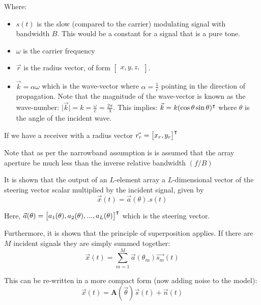 Where:
\begin{itemize}
  \item \(s(t)\) is the slow (compared to the carrier) modulating signal with bandwidth \(B\). This would be a constant for a signal that is a pure tone.
  \item \(\omega\) is the carrier frequency
  \item \( \vec{r} \) is the radius vector, of form \( \begin{bmatrix} x, y, z, \end{bmatrix} \).
  \item \(\vec{k} = \alpha\omega\) which is the wave-vector where \(\alpha = \frac{1}{c}\) pointing in the direction of propagation. Note that the magnitude of the wave-vector is known as the wave-number: \(\lvert \vec{k} \rvert = k = \frac{\omega}{c} = \frac{2\pi}{\lambda}\). This implies: \(\vec{k} = k(\cos\theta \sin\theta)^\intercal\) where \(\theta\) is the angle of the incident wave.
\end{itemize}

If we have a receiver with a radius vector \(\vec{r_r} = \begin{bmatrix} x_r, y_r \end{bmatrix}^\intercal\)

Note that as per the narrowband assumption is is assumed that the array aperture be much less than the inverse relative bandwidth \((f/B)\)

It is shown that the output of an \(L\)-element array a \(L\)-dimensional vector of the steering vector scalar multiplied by the incident signal, given by
\begin{equation}
  \vec{x}(t) = \vec{a}(\theta).s(t)
\end{equation}

Here, \(\vec{a}(\theta) = \begin{bmatrix} a_1(\theta), a_2(\theta), ... , a_L(\theta) \end{bmatrix}^\intercal\) which is the steering vector.

  Furthermore, it is shown that the principle of superposition applies. If there are \(M\) incident signals they are simply summed together:
\begin{equation}
  \vec{x}(t) = \sum_{m=1}^{M} \vec{a}(\theta_m)\vec{s_m}(t)
\end{equation}

This can be re-written in a more compact form (now adding noise to the model):
\begin{equation}
  \vec{x}(t) = \mathbf{A}(\vec{\theta})\vec{s}(t) + \vec{n}(t)
\end{equation}

